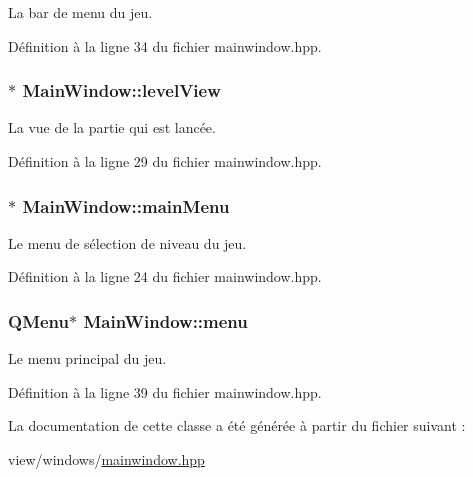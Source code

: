 La bar de menu du jeu. 



Définition à la ligne 34 du fichier mainwindow.\+hpp.

\hypertarget{classMainWindow_a62681b0c049afcba55ffbd5e5f470ca3}{}
\subsubsection[{level\+View}]{$\ast$ Main\+Window\+::level\+View\hspace{0.3cm}{\ttfamily [private]}}\label{classMainWindow_a62681b0c049afcba55ffbd5e5f470ca3}


La vue de la partie qui est lancée. 



Définition à la ligne 29 du fichier mainwindow.\+hpp.

\hypertarget{classMainWindow_acff78d8b40fc6a64c3503e9fcf120df2}{}
\subsubsection[{main\+Menu}]{$\ast$ Main\+Window\+::main\+Menu\hspace{0.3cm}{\ttfamily [private]}}\label{classMainWindow_acff78d8b40fc6a64c3503e9fcf120df2}


Le menu de sélection de niveau du jeu. 



Définition à la ligne 24 du fichier mainwindow.\+hpp.

\hypertarget{classMainWindow_a42e15f7cdb120e053ef72a06d11d73f6}{}
\subsubsection[{menu}]{\setlength{\rightskip}{0pt plus 5cm}Q\+Menu$\ast$ Main\+Window\+::menu\hspace{0.3cm}{\ttfamily [private]}}\label{classMainWindow_a42e15f7cdb120e053ef72a06d11d73f6}


Le menu principal du jeu. 



Définition à la ligne 39 du fichier mainwindow.\+hpp.



La documentation de cette classe a été générée à partir du fichier suivant \+:\begin{DoxyCompactItemize}
\item 
view/windows/\hyperlink{mainwindow_8hpp}{mainwindow.\+hpp}\end{DoxyCompactItemize}
